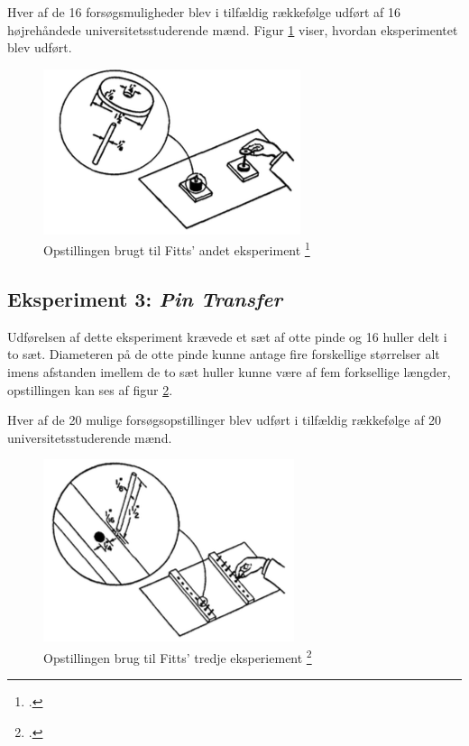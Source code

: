 Hver af de 16 forsøgsmuligheder blev i tilfældig rækkefølge udført af 16 højrehåndede universitetsstuderende mænd. Figur \ref{fig:FittsEx2} viser, hvordan eksperimentet blev udført.
\begin{figure}[h]
\centering
\includegraphics[scale=0.9]{images/illustrations/fitt_ex2}
\caption{Opstillingen brugt til Fitts' andet eksperiment \footcite{fitts1954}}
\label{fig:FittsEx2}
\end{figure}

\subsection*{Eksperiment 3: \textit{Pin Transfer}}
Udførelsen af dette eksperiment krævede et sæt af otte pinde og 16 huller delt i to sæt. Diameteren på de otte pinde kunne antage fire forskellige størrelser alt imens afstanden imellem de to sæt huller kunne være af fem forksellige længder, opstillingen kan ses af figur \ref{fig:FittsEx3}.

Hver af de 20 mulige forsøgsopstillinger blev udført i tilfældig rækkefølge af 20 universitetsstuderende mænd.
\begin{figure}[h]
\centering
\includegraphics[scale=0.9]{images/illustrations/fitt_ex3}
\caption{Opstillingen brug til Fitts' tredje eksperiement \footcite{fitts1954}}
\label{fig:FittsEx3}
\end{figure}

